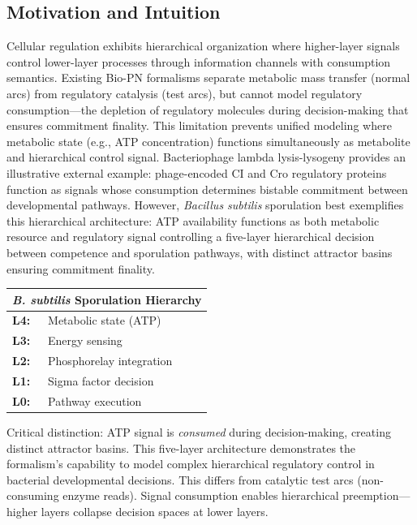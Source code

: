 
\subsection{Motivation and Intuition}

Cellular regulation exhibits hierarchical organization where higher-layer signals control lower-layer processes through information channels with consumption semantics. Existing Bio-PN formalisms separate metabolic mass transfer (normal arcs) from regulatory catalysis (test arcs), but cannot model regulatory consumption---the depletion of regulatory molecules during decision-making that ensures commitment finality. This limitation prevents unified modeling where metabolic state (e.g., ATP concentration) functions simultaneously as metabolite and hierarchical control signal. Bacteriophage lambda lysis-lysogeny provides an illustrative external example: phage-encoded CI and Cro regulatory proteins function as signals whose consumption determines bistable commitment between developmental pathways. However, \textit{Bacillus subtilis} sporulation best exemplifies this hierarchical architecture: ATP availability functions as both metabolic resource and regulatory signal controlling a five-layer hierarchical decision between competence and sporulation pathways, with distinct attractor basins ensuring commitment finality.

\begin{center}
\small
\begin{tabular}{@{}ll@{}}
\multicolumn{2}{c}{\textbf{\textit{B. subtilis} Sporulation Hierarchy}} \\
\midrule
\textbf{L4:} & Metabolic state (ATP) \\
\textbf{L3:} & Energy sensing \\
\textbf{L2:} & Phosphorelay integration \\
\textbf{L1:} & Sigma factor decision \\
\textbf{L0:} & Pathway execution
\end{tabular}
\end{center}

\vspace{3pt}
\noindent Critical distinction: ATP signal is \textit{consumed} during decision-making, creating distinct attractor basins. This five-layer architecture demonstrates the formalism's capability to model complex hierarchical regulatory control in bacterial developmental decisions. This differs from catalytic test arcs (non-consuming enzyme reads). Signal consumption enables hierarchical preemption---higher layers collapse decision spaces at lower layers.

